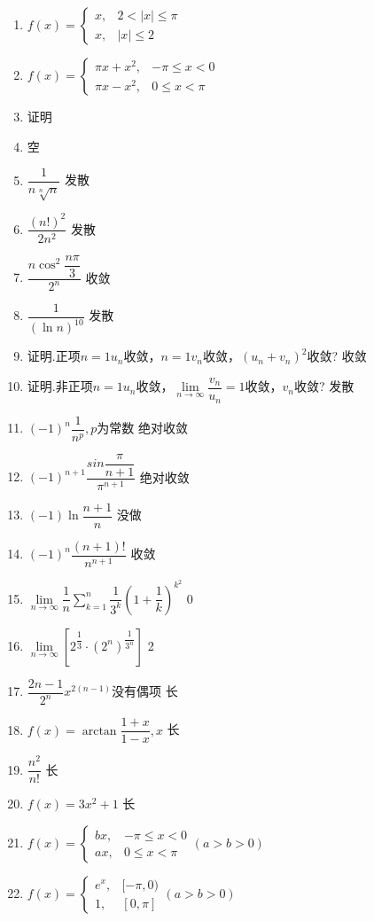 \documentclass[UTF8,a4paper,12pt,scheme=chinese]{ctexart}
\begin{document}
\begin{Large}
\begin{enumerate}
			\item 	$ f(x)=\left\lbrace \begin{array}{ll}x,&2{<}|x|\leq\pi\\x,&|x|\leq2\end{array} \right. $
			\item 	$ f(x)=\left\lbrace \begin{array}{ll}\pi x+x^2,&-\pi\leq x{<}0\\\pi x-x^2,&0\leq x{<}\pi\end{array} \right. $
			\item 	证明
			\item 	空
			\item 	$ \dfrac{1}{n\sqrt[n]{n}} $	发散
			\item 	$ \dfrac{(n!)^2}{2n^2} $	发散
			\item 	$ \dfrac{n\cos^2\dfrac{n\pi}{3}}{2^n} $	收敛
			\item 	$ \dfrac{1}{(\ln n)^10} $	发散
			\item 	证明.正项$n=1 u_n $收敛，$n=1 v_n $收敛，$ (u_n+v_n)^2 $收敛?	收敛
			\item 	证明.非正项$n=1 u_n $收敛，$\lim\limits_{n\rightarrow \infty}\dfrac{v_n}{u_n}=1$收敛，$ v_n $收敛?	发散
			\item 	$ (-1)^n\dfrac{1}{n^p},p $为常数	绝对收敛
			\item 	$ (-1)^{n+1}\dfrac{sin\dfrac{\pi}{n+1}}{\pi^{n+1}} $	绝对收敛
			\item 	$ (-1)\ln\dfrac{n+1}{n} $	没做
			\item 	$ (-1)^n\dfrac{(n+1)!}{n^{n+1}} $	收敛
			\item 	$ \lim\limits_{n\rightarrow \infty}\dfrac{1}{n}\sum_{k=1}^{n}\dfrac{1}{3^k}(1+\dfrac{1}{k})^{k^2} $	0
			\item 	$ \lim\limits_{n\rightarrow \infty}[2^{\dfrac{1}{3}}\cdot{(2^n)}^{\dfrac{1}{3^n}}] $	2
			\item 	$ \dfrac{2n-1}{2^n}x^{2(n-1)} $没有偶项	长
			\item 	$ f(x)=\arctan\dfrac{1+x}{1-x},x $	长
			\item 	$ \dfrac{n^2}{n!} $	长
			\item 	$ f(x)=3x^2+1 $	长
			\item 	$ f(x)=\left\lbrace \begin{array}{ll}bx,&-\pi\leq x{<}0\\ax,&0\leq x{<}\pi\end{array} \right.(a{>}b{>}0) $
			\item 	$ f(x)=\left\lbrace \begin{array}{ll}e^x,&[-\pi,0)\\1,&[0,\pi]\end{array} \right.(a{>}b{>}0) $

\end{enumerate}
\end{Large}
\end{document}
